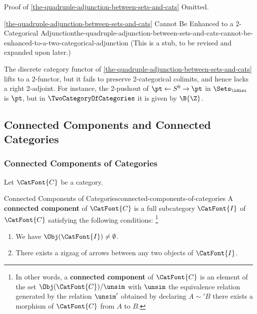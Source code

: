\begin{Proof}{Proof of \cref{the-quadruple-adjunction-between-sets-and-cats}}%
    Omitted.
\end{Proof}
\begin{warning}{\cref{the-quadruple-adjunction-between-sets-and-cats} Cannot Be Enhanced to a 2-Categorical Adjunction}{the-quadruple-adjunction-between-sets-and-cats-cannot-be-enhanced-to-a-two-categorical-adjunction}%
    (This is a stub, to be revised and expanded upon later.)

    The discrete category functor of \cref{the-quadruple-adjunction-between-sets-and-cats} lifts to a $2$-functor, but it fails to preserve 2-categorical colimits, and hence lacks a right 2-adjoint. For instance, the 2-pushout of $\pt\leftarrow S^{0}\to\pt$ in $\Sets_{\ldisc}$ is $\pt$, but in $\TwoCategoryOfCategories$ it is given by $\B{\Z}$.
\end{warning}
\subsection{Connected Components and Connected Categories}\label{subsection-connected-components-and-connected-categories}
\subsubsection{Connected Components of Categories}\label{subsubsection-the-quadruple-adjunction-with-sets-connected-components-of-categories}
Let $\CatFont{C}$ be a category.
\begin{definition}{Connected Components of Categories}{connected-components-of-categories}%
    A \textbf{connected component} of $\CatFont{C}$ is a full subcategory $\CatFont{I}$ of $\CatFont{C}$ satisfying the following conditions:%
    \footnote{%
        In other words, a \textbf{connected component} of $\CatFont{C}$ is an element of the set $\Obj(\CatFont{C})/\unsim$ with $\unsim$ the equivalence relation generated by the relation $\unsim'$ obtained by declaring $A\sim' B$ \textiff there exists a morphism of $\CatFont{C}$ from $A$ to $B$.
        \par\vspace*{\TCBBoxCorrection}
    }%
    \begin{enumerate}
        \item{}We have $\Obj(\CatFont{I})\neq\emptyset$.
        \item{}There exists a zigzag of arrows between any two objects of $\CatFont{I}$.
    \end{enumerate}
\end{definition}
